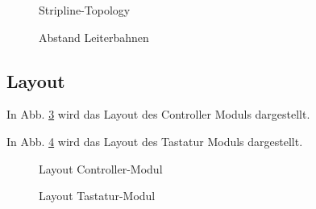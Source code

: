 \begin{figure}[H]
    \centering    
    \caption{Stripline-Topology}
    \label{Stripline}
\end{figure}

\begin{figure}[H]
    \centering    
    \caption{Abstand Leiterbahnen}
    \label{AbstandLeiterbahnen}
\end{figure}


\subsection{Layout}

In Abb. \ref{LayoutController} wird das Layout des Controller Moduls dargestellt.

In Abb. \ref{LayoutTastatur} wird das Layout des Tastatur Moduls dargestellt. 

\begin{figure}[H]
	\centering    
	\caption{Layout Controller-Modul}
	\label{LayoutController}
\end{figure}

\begin{figure}[H]
	\centering    
	\caption{Layout Tastatur-Modul}
	\label{LayoutTastatur}
\end{figure}


